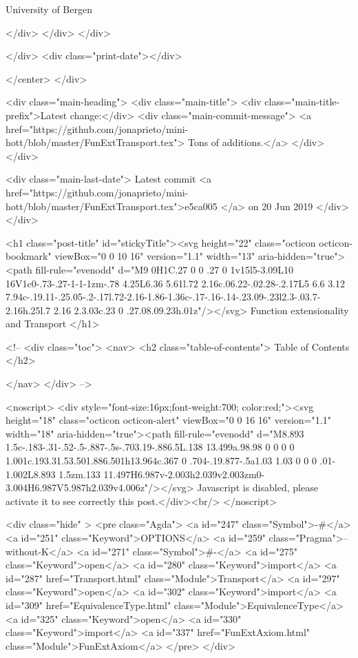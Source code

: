                  University of Bergen
                
                </div>
            </div>
          </div>
          
          
        </div>
        <div class="print-date"></div>
        
        
    </center>
  </div>

  
  <div class="main-heading">
    <div class="main-title">
      <div class="main-title-prefix">Latest change:</div>
      <div class="main-commit-message">
            <a href="https://github.com/jonaprieto/mini-hott/blob/master/FunExtTransport.tex">
              Tons of additions.</a>
      </div>
    </div>

    <div class="main-last-date">
      Latest commit <a href="https://github.com/jonaprieto/mini-hott/blob/master/FunExtTransport.tex">e5ca005 </a> on  20 Jun 2019
    </div>
  </div>
  
  <h1 class="post-title" id="stickyTitle"><svg height="22" class="octicon octicon-bookmark" viewBox="0 0 10 16" version="1.1" width="13" aria-hidden="true"><path fill-rule="evenodd" d="M9 0H1C.27 0 0 .27 0 1v15l5-3.09L10 16V1c0-.73-.27-1-1-1zm-.78 4.25L6.36 5.61l.72 2.16c.06.22-.02.28-.2.17L5 6.6 3.12 7.94c-.19.11-.25.05-.2-.17l.72-2.16-1.86-1.36c-.17-.16-.14-.23.09-.23l2.3-.03.7-2.16h.25l.7 2.16 2.3.03c.23 0 .27.08.09.23h.01z"/></svg> Function extensionality and Transport
  </h1>

  <!-- 
  <div class="toc">
    <nav>
    <h2 class="table-of-contents"> Table of Contents </h2>
      

    </nav>
  </div>
   -->

  <noscript>
  <div style="font-size:16px;font-weight:700; color:red;"><svg height="18" class="octicon octicon-alert" viewBox="0 0 16 16" version="1.1" width="18" aria-hidden="true"><path fill-rule="evenodd" d="M8.893 1.5c-.183-.31-.52-.5-.887-.5s-.703.19-.886.5L.138 13.499a.98.98 0 0 0 0 1.001c.193.31.53.501.886.501h13.964c.367 0 .704-.19.877-.5a1.03 1.03 0 0 0 .01-1.002L8.893 1.5zm.133 11.497H6.987v-2.003h2.039v2.003zm0-3.004H6.987V5.987h2.039v4.006z"/></svg> Javascript is disabled, please activate it to see correctly this post.</div><br/>
  </noscript>

  <div class="hide" >
<pre class="Agda">
<a id="247" class="Symbol">{-#</a> <a id="251" class="Keyword">OPTIONS</a> <a id="259" class="Pragma">--without-K</a> <a id="271" class="Symbol">#-}</a>
<a id="275" class="Keyword">open</a> <a id="280" class="Keyword">import</a> <a id="287" href="Transport.html" class="Module">Transport</a>
<a id="297" class="Keyword">open</a> <a id="302" class="Keyword">import</a> <a id="309" href="EquivalenceType.html" class="Module">EquivalenceType</a>
<a id="325" class="Keyword">open</a> <a id="330" class="Keyword">import</a> <a id="337" href="FunExtAxiom.html" class="Module">FunExtAxiom</a>
</pre>
</div>

